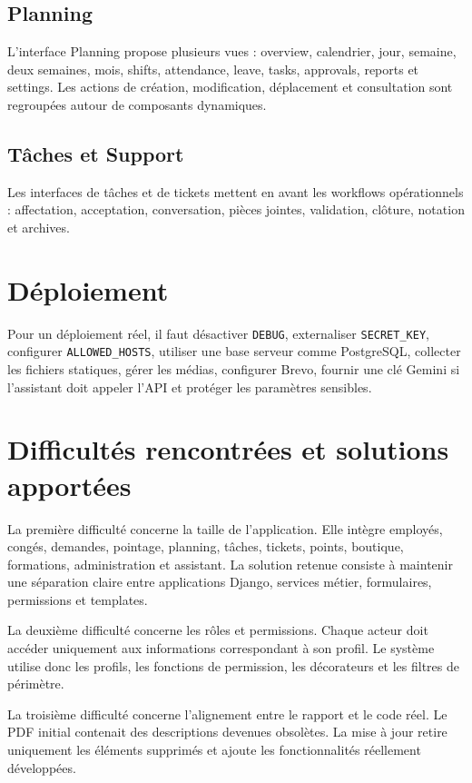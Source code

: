 \documentclass[12pt,a4paper]{report}
\begin{document}
\subsection{Planning}
L'interface Planning propose plusieurs vues : overview, calendrier, jour, semaine, deux semaines, mois, shifts, attendance, leave, tasks, approvals, reports et settings. Les actions de création, modification, déplacement et consultation sont regroupées autour de composants dynamiques.

\subsection{Tâches et Support}
Les interfaces de tâches et de tickets mettent en avant les workflows opérationnels : affectation, acceptation, conversation, pièces jointes, validation, clôture, notation et archives.

\section{Déploiement}
Pour un déploiement réel, il faut désactiver \texttt{DEBUG}, externaliser \texttt{SECRET\_KEY}, configurer \texttt{ALLOWED\_HOSTS}, utiliser une base serveur comme PostgreSQL, collecter les fichiers statiques, gérer les médias, configurer Brevo, fournir une clé Gemini si l'assistant doit appeler l'API et protéger les paramètres sensibles.

\section{Difficultés rencontrées et solutions apportées}
La première difficulté concerne la taille de l'application. Elle intègre employés, congés, demandes, pointage, planning, tâches, tickets, points, boutique, formations, administration et assistant. La solution retenue consiste à maintenir une séparation claire entre applications Django, services métier, formulaires, permissions et templates.

La deuxième difficulté concerne les rôles et permissions. Chaque acteur doit accéder uniquement aux informations correspondant à son profil. Le système utilise donc les profils, les fonctions de permission, les décorateurs et les filtres de périmètre.

La troisième difficulté concerne l'alignement entre le rapport et le code réel. Le PDF initial contenait des descriptions devenues obsolètes. La mise à jour retire uniquement les éléments supprimés et ajoute les fonctionnalités réellement développées.
\end{document}
